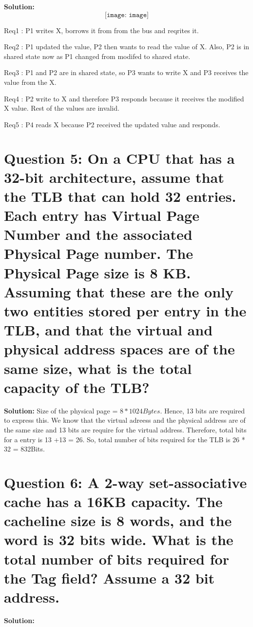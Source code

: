 \documentclass[11pt]{article}
\begin{document}
\textbf{Solution: } \[\texttt{[image: image]}\]

\newline 
Req1 : P1 writes X, borrows it from from the bus and reqrites it.

\newline 

Req2 : P1 updated the value, P2 then wants to read the value of X. Also, P2 is in shared state now as P1 changed from modifed to shared state.

\newline 

Req3 : P1 and P2 are in shared state, so P3 wants to write X and P3 receives the value from the X.

\newline 

Req4 : P2 write to X and therefore P3 responds because it receives the modified X value. Rest of the values are invalid.

\newline 

Req5 : P4 reads X because P2 received the updated value and responds.


\newline
\section* {Question 5: On a CPU that has a 32-bit architecture, assume that the TLB that can hold 32 entries. Each entry has Virtual Page Number and the associated Physical Page number. The Physical Page size is 8 KB. Assuming that these are the only two entities stored per entry in the TLB,  and that the virtual and physical address spaces are of the same size, what is the total capacity of the TLB?  }
\newline 
\textbf {Solution: }
Size of the physical page = $8 * 1024Bytes$. Hence, 13 bits are required to express this. We know that the virtual adreess and the physical address are of the same size and 13 bits are require for the virtual address. 
Therefore, total bits for a entry is 13 +13 = 26. So, total number of bits required for the TLB is 26 * 32 = 832Bits.
\newline 
\section* {Question 6: A 2-way set-associative cache has a 16KB capacity. The cacheline size is 8 words, and the word is 32 bits wide. What is the total number of bits required for the Tag field? Assume a 32 bit address.  }
\newline 
\textbf {Solution: } 
\end{document}
